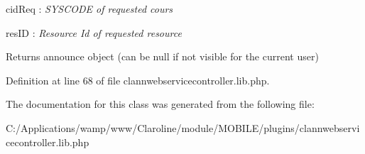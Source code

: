 \begin{DoxyPre}        cidReq : {\itshape SYSCODE of requested cours\/}\end{DoxyPre}



\begin{DoxyPre}        resID : {\itshape Resource Id of requested resource\/}\end{DoxyPre}


\begin{DoxyReturn}{Returns}
announce object (can be null if not visible for the current user) 
\end{DoxyReturn}


Definition at line 68 of file clannwebservicecontroller.lib.php.



The documentation for this class was generated from the following file:\begin{DoxyCompactItemize}
\item 
C:/Applications/wamp/www/Claroline/module/MOBILE/plugins/clannwebservicecontroller.lib.php\end{DoxyCompactItemize}
